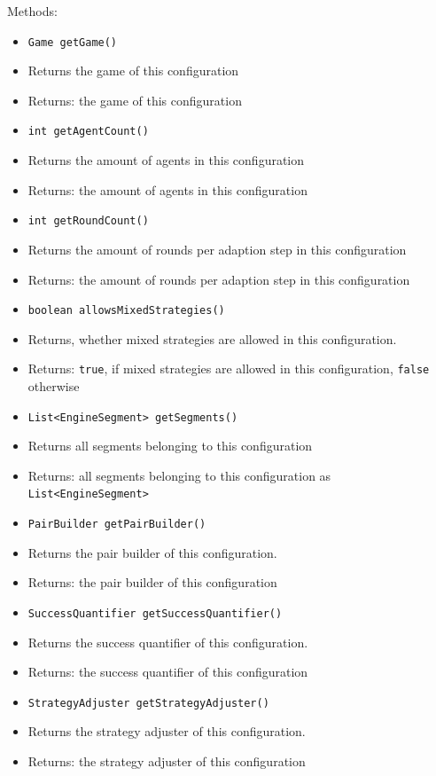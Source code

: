\documentclass[parskip=full,11pt]{scrartcl}
\begin{document}
Methods:
\begin{itemize}\itemsep -10pt
\item \texttt{Game getGame()}
\item[] Returns the game of this configuration
\item[] Returns: the game of this configuration

\item \texttt{int getAgentCount()}
\item[] Returns the amount of agents in this configuration
\item[] Returns: the amount of agents in this configuration

\item \texttt{int getRoundCount()}
\item[] Returns the amount of rounds per adaption step in this configuration
\item[] Returns: the amount of rounds per adaption step in this configuration

\item \texttt{boolean allowsMixedStrategies()}
\item[] Returns, whether mixed strategies are allowed in this configuration.
\item[] Returns: \texttt{true}, if mixed strategies are allowed in this configuration, \texttt{false} otherwise

\item \texttt{List<EngineSegment> getSegments()}
\item[] Returns all segments belonging to this configuration
\item[] Returns: all segments belonging to this configuration as \texttt{List<EngineSegment>}

\item \texttt{PairBuilder getPairBuilder()}
\item[] Returns the pair builder of this configuration.
\item[] Returns: the pair builder of this configuration

\item \texttt{SuccessQuantifier getSuccessQuantifier()}
\item[] Returns the success quantifier of this configuration.
\item[] Returns: the success quantifier of this configuration

\item \texttt{StrategyAdjuster getStrategyAdjuster()}
\item[] Returns the strategy adjuster of this configuration.
\item[] Returns: the strategy adjuster of this configuration


\end{itemize}
\end{document}
